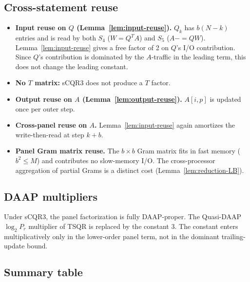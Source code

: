 \documentclass[11pt]{article}
\begin{document}
\subsection{Cross-statement reuse}
\label{sec:A2d}

\begin{itemize}[leftmargin=2em]
  \item \textbf{Input reuse on $Q$ (Lemma~\ref{lem:input-reuse}).}
    $Q_k$ has $b(N-k)$ entries and is read by both $S_4$
    ($W = Q^T A$) and $S_5$ ($A {-}{=} QW$). Lemma~\ref{lem:input-reuse}
    gives a free factor of 2 on $Q$'s I/O contribution. Since $Q$'s
    contribution is dominated by the $A$-traffic in the leading term,
    this does not change the leading constant.
  \item \textbf{No $T$ matrix:} sCQR3 does not produce a $T$ factor.
  \item \textbf{Output reuse on $A$ (Lemma~\ref{lem:output-reuse}).}
    $A[i,p]$ is updated once per outer step.
  \item \textbf{Cross-panel reuse on $A$.} Lemma~\ref{lem:input-reuse}
    again amortizes the write-then-read at step $k+b$.
  \item \textbf{Panel Gram matrix reuse.} The $b \times b$ Gram matrix
    fits in fast memory ($b^2 \le M$) and contributes no slow-memory
    I/O. The cross-processor aggregation of partial Grams is a
    distinct cost (Lemma~\ref{lem:reduction-LB}).
\end{itemize}

\subsection{DAAP multipliers}
\label{sec:A2e}

Under sCQR3, the panel factorization is fully DAAP-proper. The
Quasi-DAAP $\log_2 P_r$ multiplier of TSQR is replaced by the constant
$3$. The constant enters multiplicatively only in the lower-order
panel term, not in the dominant trailing-update bound.

\subsection{Summary table}
\label{sec:A2f}
\end{document}
